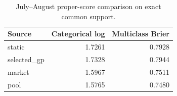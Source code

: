 \begin{table}[htbp]
\centering
\caption{July--August proper-score comparison on exact common support.}
\label{tab:external-proper-scores}
\begin{tabular}{lrr}
\toprule
Source & Categorical log & Multiclass Brier \\
\midrule
static & 1.7261 & 0.7928 \\
selected\_gp & 1.7328 & 0.7944 \\
market & 1.5967 & 0.7511 \\
pool & 1.5765 & 0.7480 \\
\bottomrule
\end{tabular}
\end{table}
